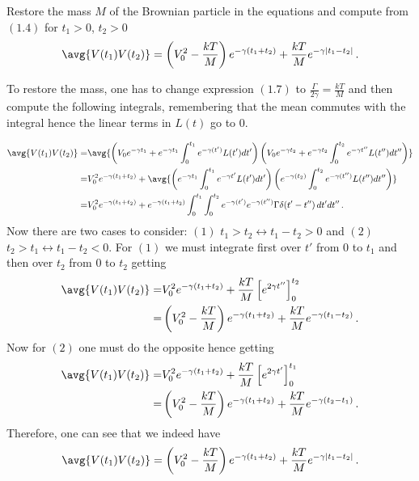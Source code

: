 

Restore the mass $M$ of the Brownian particle in the equations and compute from $(1.4)$ for $t_1 > 0$, $t_2 > 0$
\begin{equation*}
\avg{V(t_1)V(t_2)} = \left( V_0^2 - \frac{kT}{M} \right) e^{-\gamma (t_1 + t_2)} + \frac{kT}{M} e^{-\gamma |t_1-t_2|} \, .
\end{equation*}



To restore the mass, one has to change expression $(1.7)$ to $\frac{\Gamma}{2\gamma}=\frac{kT}{M}$ and then compute the following integrals, remembering that the mean commutes with the integral hence the linear terms in $L(t)$ go to $0$.

\begin{align*}
\avg{V(t_1)V(t_2)} =& \avg{
\left( V_0 e^{-\gamma t_1}+ e^{-\gamma t_1} \int_0^{t_1} e^{-\gamma (t')}L(t')dt' \right) 
\left( V_0 e^{-\gamma t_2} + e^{-\gamma t_2} \int_0^{t_2} e^{-\gamma t''} L(t'')dt'' \right) } \\
= & V_0^2 e^{-\gamma (t_1 + t_2)} + \avg{ \left( e^{-\gamma t_1} \int_0^{t_1} e^{-\gamma t'} L(t')dt' \right) \left( e^{-\gamma (t_2)} \int_0^{t_2} e^{-\gamma (t'')} L(t'')dt'' \right) } \\
= & V_0^2 e^{-\gamma (t_1+t_2)} + e^{-\gamma (t_1+t_2)} \int_0^{t_1} \int_0^{t_2} e^{-\gamma (t')} e^{-\gamma (t'')} \Gamma \delta(t'-t'') \, dt'dt'' \, .
\end{align*}
Now there are two cases to consider: $(1)$ $t_1>t_2 \leftrightarrow t_1-t_2>0$ and $(2)$ $t_2>t_1 \leftrightarrow t_1-t_2<0$.
For $(1)$ we must integrate first over $t'$ from $0$ to $t_1$ and then over $t_2$ from $0$ to $t_2$ getting
\begin{align*}
\avg{ V(t_1)V(t_2) } =& V_0^2 e^{-\gamma (t_1+t_2)} + \frac{kT}{M} \left[ e^{2\gamma t''} \right]_0^{t_2} \\
=& \left( V_0^2 - \frac{kT}{M} \right) e^{-\gamma (t_1+t_2)} + \frac{kT}{M} e^{-\gamma (t_1-t_2)} \, .
\end{align*}
Now for $(2)$ one must do the opposite hence getting
\begin{align*}
\avg{V(t_1)V(t_2)}
=& V_0^2 e^{-\gamma (t_1+t_2)} + \frac{kT}{M} \left[ e^{2\gamma t'} \right]_0^{t_1} \\
=& \left( V_0^2 - \frac{kT}{M} \right) e^{-\gamma (t_1+t_2)} + \frac{kT}{M} e^{-\gamma (t_2-t_1)} \, .
\end{align*}
Therefore, one can see that we indeed have
\begin{equation*}
\avg{ V(t_1)V(t_2) } = \left( V_0^2 - \frac{kT}{M} \right) e^{-\gamma (t_1 + t_2)} + \frac{kT}{M} e^{-\gamma |t_1-t_2|} \, .
\end{equation*}